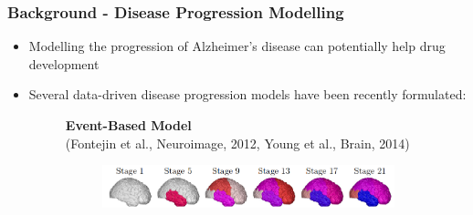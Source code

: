 \documentclass[8pt,xcolor=table]{beamer}
\begin{document}
\begin{frame}
\frametitle{Background - Disease Progression Modelling}

\newcommand{\mnpHeight}{3cm}

\vspace{-3em}
\begin{itemize}
  \item Modelling the progression of Alzheimer's disease can potentially help drug development
  \item Several data-driven disease progression models have been recently formulated:
  
  
  \hspace{-2em}
  \begin{small}
  \begin{figure}[h]
  \centering
    \begin{minipage}[t][\mnpHeight][t]{0.49\linewidth}
   \centering
    \textbf{Event-Based Model}\\ \footnotesize{(Fontejin et al., Neuroimage, 2012, Young et al., Brain, 2014)}\\    %
    \begin{subfigure}{0.57\textwidth}
    \vspace{-9em}
    \includegraphics[width=\textwidth,trim=0 0 450 0,clip]{young_progression2}
    

\end{subfigure}
\end{minipage}
\end{figure}
\end{small}
\end{itemize}
\end{frame}
\end{document}
